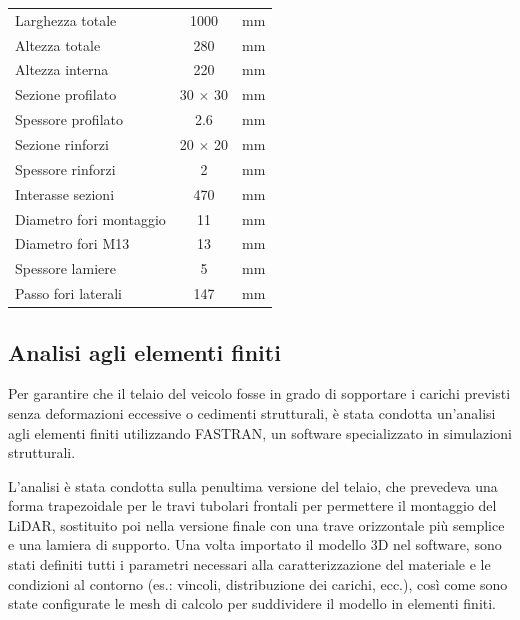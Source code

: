 \begin{table}[htbp]
\begin{minipage}[t]{0.48\textwidth}
\begin{tabular}{|l|c|c|}
            Larghezza totale        & 1000            & mm             \\
            Altezza totale          & 280             & mm             \\
            Altezza interna         & 220             & mm             \\
            Sezione profilato       & 30 $\times$ 30  & mm             \\
            Spessore profilato      & 2.6             & mm             \\
            Sezione rinforzi        & 20 $\times$ 20  & mm             \\
            Spessore rinforzi       & 2               & mm             \\
            Interasse sezioni       & 470             & mm             \\
            Diametro fori montaggio & 11              & mm             \\
            Diametro fori M13       & 13              & mm             \\
            Spessore lamiere        & 5               & mm             \\
            Passo fori laterali     & 147             & mm             \\
            \hline
        \end{tabular}
    \end{minipage}
\end{table}

\subsection{Analisi agli elementi finiti}
Per garantire che il telaio del veicolo fosse in grado di sopportare i carichi previsti senza deformazioni eccessive o cedimenti strutturali, è stata condotta un'analisi agli elementi finiti utilizzando FASTRAN, un software specializzato in simulazioni strutturali.

L'analisi è stata condotta sulla penultima versione del telaio, che prevedeva una forma trapezoidale per le travi tubolari frontali per permettere il montaggio del LiDAR, sostituito poi nella versione finale con una trave orizzontale più semplice e una lamiera di supporto. Una volta importato il modello 3D nel software, sono stati definiti tutti i parametri necessari alla caratterizzazione del materiale e le condizioni al contorno (es.: vincoli, distribuzione dei carichi, ecc.), così come sono state configurate le mesh di calcolo per suddividere il modello in elementi finiti.

